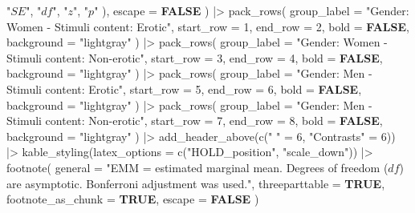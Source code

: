 \documentclass[
  bookmarksnumbered]{article}
\newenvironment{Shaded}{\begin{snugshade}}{\end{snugshade}}
\newcommand{\AttributeTok}[1]{\textcolor[rgb]{0.80,0.80,0.80}{#1}}
\newcommand{\ConstantTok}[1]{\textcolor[rgb]{0.86,0.64,0.64}{\textbf{#1}}}
\newcommand{\DecValTok}[1]{\textcolor[rgb]{0.86,0.86,0.80}{#1}}
\newcommand{\FunctionTok}[1]{\textcolor[rgb]{0.94,0.94,0.56}{#1}}
\newcommand{\NormalTok}[1]{\textcolor[rgb]{0.80,0.80,0.80}{#1}}
\newcommand{\OtherTok}[1]{\textcolor[rgb]{0.94,0.94,0.56}{#1}}
\newcommand{\SpecialCharTok}[1]{\textcolor[rgb]{0.86,0.64,0.64}{#1}}
\newcommand{\StringTok}[1]{\textcolor[rgb]{0.80,0.58,0.58}{#1}}
\begin{document}
\begin{Shaded}
\begin{Highlighting}[]
      \StringTok{"$SE$"}\NormalTok{,}
      \StringTok{"$df$"}\NormalTok{,}
      \StringTok{"$z$"}\NormalTok{,}
      \StringTok{"$p$"}
\NormalTok{    ),}
    \AttributeTok{escape =} \ConstantTok{FALSE}
\NormalTok{  ) }\SpecialCharTok{|\textgreater{}}
  \FunctionTok{pack\_rows}\NormalTok{(}
    \AttributeTok{group\_label =} \StringTok{"Gender: Women {-} Stimuli content: Erotic"}\NormalTok{,}
    \AttributeTok{start\_row =} \DecValTok{1}\NormalTok{,}
    \AttributeTok{end\_row =} \DecValTok{2}\NormalTok{,}
    \AttributeTok{bold =} \ConstantTok{FALSE}\NormalTok{,}
    \AttributeTok{background =} \StringTok{"lightgray"}
\NormalTok{  ) }\SpecialCharTok{|\textgreater{}}
  \FunctionTok{pack\_rows}\NormalTok{(}
    \AttributeTok{group\_label =} \StringTok{"Gender: Women {-} Stimuli content: Non{-}erotic"}\NormalTok{,}
    \AttributeTok{start\_row =} \DecValTok{3}\NormalTok{,}
    \AttributeTok{end\_row =} \DecValTok{4}\NormalTok{,}
    \AttributeTok{bold =} \ConstantTok{FALSE}\NormalTok{,}
    \AttributeTok{background =} \StringTok{"lightgray"}
\NormalTok{  ) }\SpecialCharTok{|\textgreater{}}
  \FunctionTok{pack\_rows}\NormalTok{(}
    \AttributeTok{group\_label =} \StringTok{"Gender: Men {-} Stimuli content: Erotic"}\NormalTok{,}
    \AttributeTok{start\_row =} \DecValTok{5}\NormalTok{,}
    \AttributeTok{end\_row =} \DecValTok{6}\NormalTok{,}
    \AttributeTok{bold =} \ConstantTok{FALSE}\NormalTok{,}
    \AttributeTok{background =} \StringTok{"lightgray"}
\NormalTok{  ) }\SpecialCharTok{|\textgreater{}}
  \FunctionTok{pack\_rows}\NormalTok{(}
    \AttributeTok{group\_label =} \StringTok{"Gender: Men {-} Stimuli content: Non{-}erotic"}\NormalTok{,}
    \AttributeTok{start\_row =} \DecValTok{7}\NormalTok{,}
    \AttributeTok{end\_row =} \DecValTok{8}\NormalTok{,}
    \AttributeTok{bold =} \ConstantTok{FALSE}\NormalTok{,}
    \AttributeTok{background =} \StringTok{"lightgray"}
\NormalTok{  ) }\SpecialCharTok{|\textgreater{}}
  \FunctionTok{add\_header\_above}\NormalTok{(}\FunctionTok{c}\NormalTok{(}\StringTok{" "} \OtherTok{=} \DecValTok{6}\NormalTok{, }\StringTok{"Contrasts"} \OtherTok{=} \DecValTok{6}\NormalTok{)) }\SpecialCharTok{|\textgreater{}}
  \FunctionTok{kable\_styling}\NormalTok{(}\AttributeTok{latex\_options =} \FunctionTok{c}\NormalTok{(}\StringTok{"HOLD\_position"}\NormalTok{, }\StringTok{"scale\_down"}\NormalTok{)) }\SpecialCharTok{|\textgreater{}}
  \FunctionTok{footnote}\NormalTok{(}
    \AttributeTok{general =} \StringTok{"EMM = estimated marginal mean.}
\StringTok{           Degrees of freedom ($df$) are asymptotic.}
\StringTok{           Bonferroni adjustment was used."}\NormalTok{,}
    \AttributeTok{threeparttable =} \ConstantTok{TRUE}\NormalTok{,}
    \AttributeTok{footnote\_as\_chunk =} \ConstantTok{TRUE}\NormalTok{,}
    \AttributeTok{escape =} \ConstantTok{FALSE}
\NormalTok{  )}
\end{Highlighting}
\end{Shaded}
\end{document}

